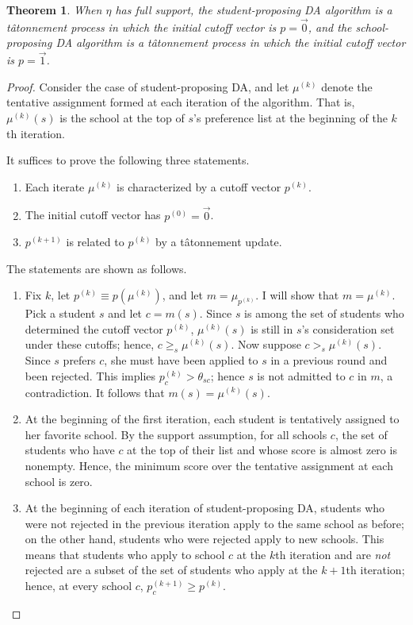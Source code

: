 \documentclass[12pt]{article}
\numberwithin{equation}{subsection}
\newtheorem{theorem}{Theorem}
\theoremstyle{definition}
\begin{document}
\begin{theorem}When $\eta$ has full support, the student-proposing DA algorithm is a t\^{a}tonnement process in which the initial cutoff vector is $p = \vec 0$, and the school-proposing DA algorithm is a t\^{a}tonnement process in which the initial cutoff vector is $p = \vec 1$. \end{theorem}
\begin{proof}
Consider the case of student-proposing DA, and let $\mu^{(k)}$ denote the tentative assignment formed at each iteration of the algorithm. That is, $\mu^{(k)}(s)$ is the school at the top of $s$’s preference list at the beginning of the $k$th iteration.

It suffices to prove the following three statements.
\begin{enumerate}
\item Each iterate $\mu^{(k)}$ is characterized by a cutoff vector $p^{(k)}$.
\item The initial cutoff vector has $p^{(0)} = \vec 0$.
\item $p^{(k+1)}$ is related to $p^{(k)}$ by a t\^{a}tonnement update.
\end{enumerate}
The statements are shown as follows. 
\begin{enumerate}
\item Fix $k$, let $p^{(k)} \equiv p\left(\mu^{(k)}\right)$, and let $m = \mu_{p^{(k)}}$. I will show that $m = \mu^{(k)}$. Pick a student $s$ and let $c = m(s)$. Since $s$ is among the set of students who determined the cutoff vector $p^{(k)}$, $ \mu^{(k)}(s)$ is still in $s$’s consideration set under these cutoffs; hence,  $c \geq_s \mu^{(k)}(s)$.  Now suppose $c >_s \mu^{(k)}(s)$. Since $s$ prefers $c$, she must have been applied to $s$ in a previous round and been rejected. This implies $p^{(k)}_{c} > \theta_{sc}$; hence $s$ is not admitted to $c$ in $m$, a contradiction. It follows that $m(s) = \mu^{(k)}(s)$. 

\item At the beginning of the first iteration, each student is tentatively assigned to her favorite school. By the support assumption, for all schools $c$, the set of students who have $c$ at the top of their list and whose score is almost zero is nonempty. Hence, the minimum score over the tentative assignment at each school is zero.

\item At the beginning of each iteration of student-proposing DA, students who were not rejected in the previous iteration apply to the same school as before; on the other hand, students who were rejected apply to new schools. This means that students who apply to school $c$ at the $k$th iteration and are \emph{not} rejected are a subset of the set of students who apply at the $k+1$th iteration; hence, at every school $c$, $p_c^{(k+1)} \geq p^{(k)}$.


\end{enumerate}
\end{proof}
\end{document}

